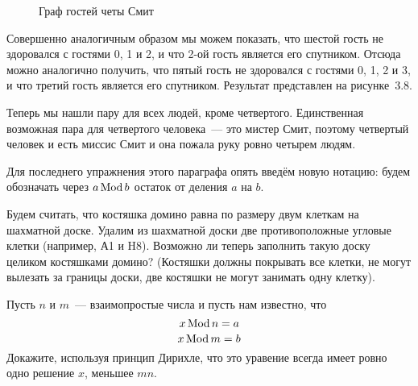 \begin{example}
\begin{figure}[h]
\caption{Граф гостей четы Смит}
\end{figure}

Совершенно аналогичным образом мы можем показать, что шестой гость не здоровался с гостями 0, 1 и 2, и что 2-ой гость является его спутником. Отсюда можно аналогично получить, что пятый гость не здоровался с гостями 0, 1, 2 и 3, и что третий гость является его спутником. Результат представлен на рисунке~3.8.

Теперь мы нашли пару для всех людей, кроме четвертого. Единственная возможная пара для четвертого человека~--- это мистер Смит, поэтому четвертый человек и есть миссис Смит и она пожала руку ровно четырем людям.
\end{example}

Для последнего упражнения этого параграфа опять введём новую нотацию: будем обозначать через $a\operatorname{Mod} b$ остаток от деления $a$ на $b$.

\begin{exercise}
Будем считать, что костяшка домино равна по размеру двум клеткам на шахматной доске. Удалим из шахматной доски две противоположные угловые клетки (например, А1 и H8). Возможно ли теперь заполнить такую доску целиком костяшками домино? (Костяшки должны покрывать все клетки, не могут вылезать за границы доски, две костяшки не могут занимать одну клетку).
\end{exercise}

\begin{exercise}
Пусть $n$ и $m$~--- взаимопростые числа и пусть нам известно, что
$$x\operatorname{Mod} n = a$$
$$x\operatorname{Mod} m = b$$
Докажите, используя принцип Дирихле, что это уравение всегда имеет ровно одно решение $x$, меньшее $mn$.
\end{exercise}
